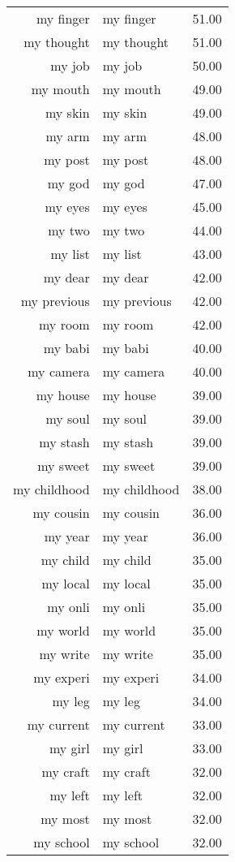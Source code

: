 \begin{table}[ht]
\begin{tabular}{rlr}
  my finger & my finger & 51.00 \\ 
  my thought & my thought & 51.00 \\ 
  my job & my job & 50.00 \\ 
  my mouth & my mouth & 49.00 \\ 
  my skin & my skin & 49.00 \\ 
  my arm & my arm & 48.00 \\ 
  my post & my post & 48.00 \\ 
  my god & my god & 47.00 \\ 
  my eyes & my eyes & 45.00 \\ 
  my two & my two & 44.00 \\ 
  my list & my list & 43.00 \\ 
  my dear & my dear & 42.00 \\ 
  my previous & my previous & 42.00 \\ 
  my room & my room & 42.00 \\ 
  my babi & my babi & 40.00 \\ 
  my camera & my camera & 40.00 \\ 
  my house & my house & 39.00 \\ 
  my soul & my soul & 39.00 \\ 
  my stash & my stash & 39.00 \\ 
  my sweet & my sweet & 39.00 \\ 
  my childhood & my childhood & 38.00 \\ 
  my cousin & my cousin & 36.00 \\ 
  my year & my year & 36.00 \\ 
  my child & my child & 35.00 \\ 
  my local & my local & 35.00 \\ 
  my onli & my onli & 35.00 \\ 
  my world & my world & 35.00 \\ 
  my write & my write & 35.00 \\ 
  my experi & my experi & 34.00 \\ 
  my leg & my leg & 34.00 \\ 
  my current & my current & 33.00 \\ 
  my girl & my girl & 33.00 \\ 
  my craft & my craft & 32.00 \\ 
  my left & my left & 32.00 \\ 
  my most & my most & 32.00 \\ 
  my school & my school & 32.00 \\ 

\end{tabular}
\end{table}
